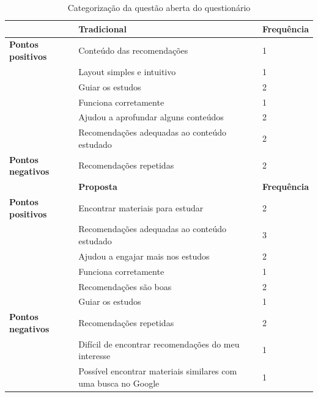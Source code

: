 \begin{table}[h]
\centering
\caption{Categorização da questão aberta do questionário}
\label{ref:categorizacao-questao-aberta}
\footnotesize
\begin{tabular}{|p{3cm}|p{10cm}|p{2cm}|}
\hline
                          & \textbf{Tradicional}                                           & \textbf{Frequência} \\
\hline
\textbf{Pontos positivos} & Conteúdo das recomendações                                     & 1          \\
                          & Layout simples e intuitivo                                     & 1          \\
                          & Guiar os estudos                                               & 2          \\
                          & Funciona corretamente                                          & 1          \\
                          & Ajudou a aprofundar alguns conteúdos                           & 2          \\
                          & Recomendações adequadas ao conteúdo estudado                   & 2          \\
\hline
\textbf{Pontos negativos} & Recomendações repetidas                                        & 2          \\
\hline
                          & \textbf{Proposta}                                              & \textbf{Frequência} \\
\hline
\textbf{Pontos positivos} & Encontrar materiais para estudar                               & 2          \\
                          & Recomendações adequadas ao conteúdo estudado                   & 3          \\
                          & Ajudou a engajar mais nos estudos                              & 2          \\
                          & Funciona corretamente                                          & 1          \\
                          & Recomendações são boas                                         & 2          \\
                          & Guiar os estudos                                               & 1          \\
\hline
\textbf{Pontos negativos} & Recomendações repetidas                                        & 2          \\
                          & Difícil de encontrar recomendações do meu interesse            & 1          \\
                          & Possível encontrar materiais similares com uma busca no Google & 1          \\
\hline
\end{tabular}
\end{table}

